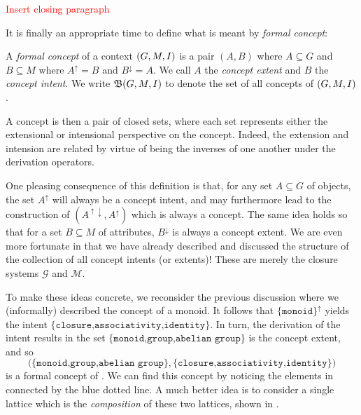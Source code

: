 \textcolor{red}{Insert closing paragraph}
\vspace{6em}

It is finally an appropriate time to define what is meant by \textit{formal concept}:

\begin{definition}
    \label{definition:formal-concept} A \emph{formal concept} of a context $(G,M,\mathrel{I})$ is a pair $(A,B)$ where $A \subseteq G$ and $B\subseteq M$ where
  $A^{\uparrow}= B$ and $B^{\downarrow}= A$. We call $A$ the \emph{concept extent} and $B$ the \emph{concept intent}. We write ${\mathfrak B} (G,M,\mathrel{I})$ to denote the set of all concepts of $(G,M,\mathrel{I})$.
\end{definition}

A concept is then a pair of closed sets, where each set represents either the extensional or intensional perspective on the concept. Indeed, the extension and intension are related by virtue of being the
inverses of one another under the derivation operators.

One pleasing consequence of this definition is that, for any set $A\subseteq G$ of objects, the set $A^{\uparrow}$ will always be a concept intent, and may furthermore lead to the construction of
$(A^{\uparrow \downarrow}, A^{\uparrow})$ which is always a concept. The same idea holds so that for a set $B \subseteq M$ of attributes, $B^{\downarrow}$ is always a concept extent. We are even more fortunate
in that we have already described and discussed the structure of the collection of all concept intents (or extents)! These are merely the closure systems $\mathcal{G}$ and $\mathcal{M}$.

To make these ideas concrete, we reconsider the previous discussion where we (informally) described the concept of a monoid. It follows that $\{\texttt{monoid}\}^{\uparrow}$ yields the intent
$\{\texttt{closure,associativity,identity}\}$. In turn, the derivation of the intent results in the set $\{\texttt{monoid,group,abelian group}\}$ is the concept extent, and so
\[
  \big(\{\texttt{monoid,group,abelian group}\}, \{\texttt{closure,associativity,identity}\}\big)
\]
is a formal concept of . We can find this concept by noticing the elements in  connected by the blue dotted line. A much better idea is to consider a single
lattice which is the \textit{composition} of these two lattices, shown in .

